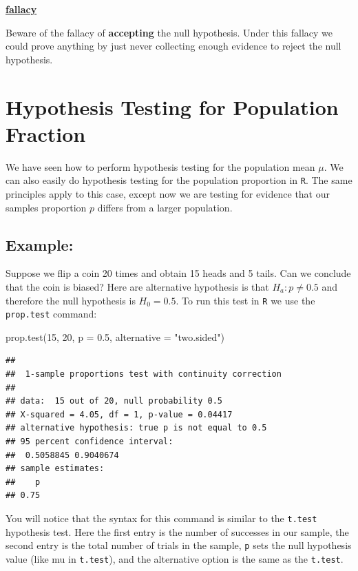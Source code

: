 \documentclass[
]{book}
\newenvironment{Shaded}{\begin{snugshade}}{\end{snugshade}}
\newcommand{\AttributeTok}[1]{\textcolor[rgb]{0.77,0.63,0.00}{#1}}
\newcommand{\DecValTok}[1]{\textcolor[rgb]{0.00,0.00,0.81}{#1}}
\newcommand{\FloatTok}[1]{\textcolor[rgb]{0.00,0.00,0.81}{#1}}
\newcommand{\FunctionTok}[1]{\textcolor[rgb]{0.00,0.00,0.00}{#1}}
\newcommand{\NormalTok}[1]{#1}
\newcommand{\StringTok}[1]{\textcolor[rgb]{0.31,0.60,0.02}{#1}}
\newenvironment{rmdblock}[1]
  {\begin{shaded*}
  \centerline{\underline{\textbf{#1}}}

  }
  {
  \end{shaded*}
  }
\newenvironment{fallacy}
  {\begin{rmdblock}{fallacy}}
  {\end{rmdblock}}
\theoremstyle{definition}
\theoremstyle{definition}
\theoremstyle{definition}
\theoremstyle{definition}
\theoremstyle{remark}
\begin{document}
\begin{fallacy}
Beware of the fallacy of \textbf{accepting} the null hypothesis. Under this fallacy we could prove anything by just never collecting enough evidence to reject the null hypothesis.
\end{fallacy}

\hypertarget{hypothesis-testing-for-population-fraction}{%
\section{Hypothesis Testing for Population Fraction}\label{hypothesis-testing-for-population-fraction}}

We have seen how to perform hypothesis testing for the population mean \(\mu\). We can also easily do hypothesis testing for the population proportion in \texttt{R}. The same principles apply to this case, except now we are testing for evidence that our samples proportion \(p\) differs from a larger population.

\hypertarget{example-3}{%
\subsection{Example:}\label{example-3}}

Suppose we flip a coin 20 times and obtain 15 heads and 5 tails. Can we conclude that the coin is biased? Here are alternative hypothesis is that \(H_a: p \neq 0.5\) and therefore the null hypothesis is \(H_0=0.5\). To run this test in \texttt{R} we use the \texttt{prop.test} command:

\begin{Shaded}
\begin{Highlighting}[]
\FunctionTok{prop.test}\NormalTok{(}\DecValTok{15}\NormalTok{, }\DecValTok{20}\NormalTok{, }\AttributeTok{p =} \FloatTok{0.5}\NormalTok{, }\AttributeTok{alternative =} \StringTok{"two.sided"}\NormalTok{)}
\end{Highlighting}
\end{Shaded}

\begin{verbatim}
## 
##  1-sample proportions test with continuity correction
## 
## data:  15 out of 20, null probability 0.5
## X-squared = 4.05, df = 1, p-value = 0.04417
## alternative hypothesis: true p is not equal to 0.5
## 95 percent confidence interval:
##  0.5058845 0.9040674
## sample estimates:
##    p 
## 0.75
\end{verbatim}

You will notice that the syntax for this command is similar to the \texttt{t.test} hypothesis test. Here the first entry is the number of successes in our sample, the second entry is the total number of trials in the sample, \texttt{p} sets the null hypothesis value (like mu in \texttt{t.test}), and the alternative option is the same as the \texttt{t.test}.
\end{document}
